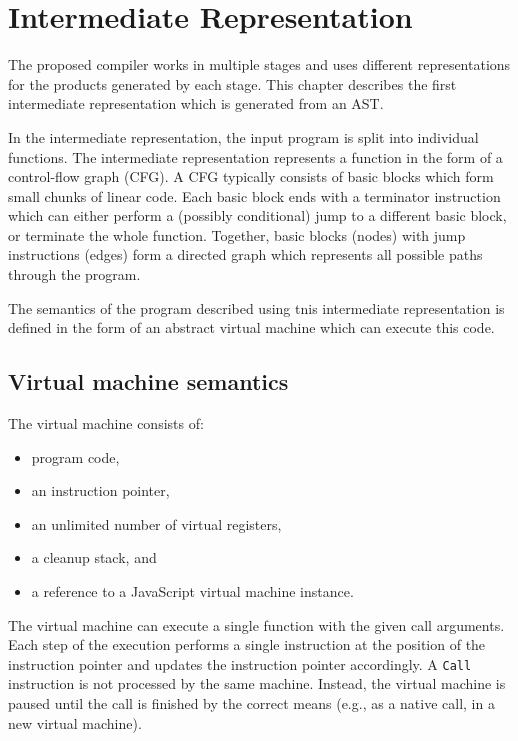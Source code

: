 \chapter{Intermediate Representation}\label{ir}

The proposed compiler works in multiple stages and uses different representations for the products generated by each stage. This chapter describes the first intermediate representation which is generated from an AST.

In the intermediate representation, the input program is split into individual functions. The intermediate representation represents a function in the form of a control-flow graph (CFG). A CFG typically consists of basic blocks which form small chunks of linear code. Each basic block ends with a terminator instruction which can either perform a (possibly conditional) jump to a different basic block, or terminate the whole function. Together, basic blocks (nodes) with jump instructions (edges) form a directed graph which represents all possible paths through the program.

The semantics of the program described using tnis intermediate representation is defined in the form of an abstract virtual machine which can execute this code.

\section{Virtual machine semantics}

The virtual machine consists of:
\begin{itemize}
    \item program code,
    \item an instruction pointer,
    \item an unlimited number of virtual registers,
    \item a cleanup stack, and
    \item a reference to a JavaScript virtual machine instance.
\end{itemize}

The virtual machine can execute a single function with the given call arguments. Each step of the execution performs a single instruction at the position of the instruction pointer and updates the instruction pointer accordingly. A \texttt{Call} instruction is not processed by the same machine. Instead, the virtual machine is paused until the call is finished by the correct means (e.g., as a native call, in a new virtual machine).

